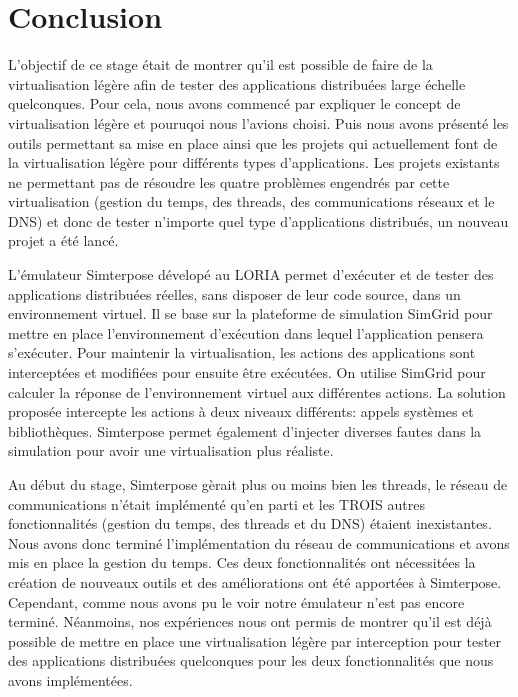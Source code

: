 \section{Conclusion}
\label{section:ccl}

L'objectif de ce stage était de montrer qu'il est possible de faire de la
virtualisation légère afin de tester des applications distribuées large échelle
quelconques. Pour cela, nous avons commencé par expliquer le concept de
virtualisation légère et pouruqoi nous l'avions choisi. Puis nous avons présenté
les outils permettant sa mise en place ainsi que les projets qui actuellement
font de la virtualisation légère pour différents types d'applications. Les
projets existants ne permettant pas de résoudre les quatre problèmes engendrés
par cette virtualisation (gestion du temps, des threads, des communications
réseaux et le DNS) et donc de tester n'importe quel type d'applications
distribués, un nouveau projet a été lancé.

L'émulateur Simterpose dévelopé au LORIA permet d'exécuter et de tester des
applications distribuées réelles, sans disposer de leur code source, dans un
environnement virtuel. Il se base sur la plateforme de simulation SimGrid pour
mettre en place l'environnement d'exécution dans lequel l'application pensera
s'exécuter. Pour maintenir la virtualisation, les actions des applications sont
interceptées et modifiées pour ensuite être exécutées. On utilise SimGrid pour
calculer la réponse de l'environnement virtuel aux différentes actions. La
solution proposée intercepte les actions à deux niveaux différents: appels
systèmes et bibliothèques. Simterpose permet également d'injecter diverses
fautes dans la simulation pour avoir une virtualisation plus réaliste.

Au début du stage, Simterpose gèrait plus ou moins bien les threads, le réseau
de communications n'était implémenté qu'en parti et les TROIS autres
fonctionnalités (gestion du temps, des threads et du DNS) étaient
inexistantes. Nous avons donc terminé l'implémentation du réseau de
communications et avons mis en place la gestion du temps. Ces deux
fonctionnalités ont nécessitées la création de nouveaux outils et des
améliorations ont été apportées à Simterpose. Cependant, comme nous avons pu le
voir notre émulateur n'est pas encore terminé. Néanmoins, nos expériences nous
ont permis de montrer qu'il est déjà possible de mettre en place une
virtualisation légère par interception pour tester des applications distribuées
quelconques pour les deux fonctionnalités que nous avons implémentées.
